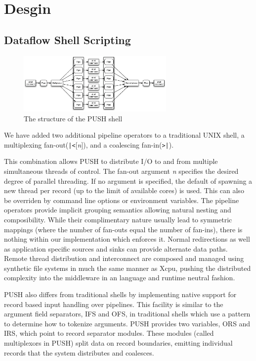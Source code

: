 \section{Desgin}

\subsection{Dataflow Shell Scripting}

\begin{figure}[htp]
\centering
\includegraphics[width=3in]{pipestruct.eps}
\caption{The structure of the PUSH shell}
\label{fig:pipestruct}
\end{figure}

We have added two additional pipeline operators to a traditional UNIX shell,
a multiplexing fan-out(\verb!|<![\emph{n}]), and a coalescing fan-in(\verb!>|!).
 
This combination allows PUSH to distribute I/O to and from multiple
simultaneous threads of control.
The fan-out argument \emph{n} specifies the desired degree of parallel
threading.  If no argument is specified, the default of spawning a new
thread per record (up to the limit of available cores) is used.  This can
also be overriden by command line options or environment variables.
The pipeline operators provide implicit grouping semantics allowing natural
nesting and composibility.
While their complimentary nature usually lead to symmetric
mappings (where the number of fan-outs equal the number of fan-ins), there is
nothing within our implementation which enforces it.
Normal redirections as well as application specific sources and sinks
can provide alternate data paths.
Remote thread distribution and interconnect are composed and managed
using synthetic file systems in much the same manner as Xcpu,\cite{xcpu}
pushing the distributed complexity into the middleware in an language and
runtime neutral fashion.

PUSH also differs from traditional shells by implementing native support for
record based input handling over pipelines. This facility is similar to the
argument field separators, IFS and OFS, in traditional shells which use a
pattern to determine how to tokenize arguments. PUSH provides two variables,
ORS and IRS, which point to record separator modules. These modules
(called multiplexors in PUSH) split data on record boundaries, emitting
individual records that the system distributes and coalesces.

